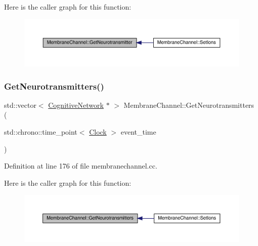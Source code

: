 Here is the caller graph for this function\+:\nopagebreak
\begin{figure}[H]
\begin{center}
\leavevmode
\includegraphics[width=350pt]{class_membrane_channel_a91ce6506a8e82905de7cd031ed5d63f5_icgraph}
\end{center}
\end{figure}
\mbox{\label{class_membrane_channel_a9fdb20eb7d3f9ebad864d07aaa835716}} 
\subsubsection{\texorpdfstring{Get\+Neurotransmitters()}{GetNeurotransmitters()}}
{\footnotesize\ttfamily std\+::vector$<$ \hyperlink{class_cognitive_network}{Cognitive\+Network} $\ast$ $>$ Membrane\+Channel\+::\+Get\+Neurotransmitters (\begin{DoxyParamCaption}\item[{std\+::chrono\+::time\+\_\+point$<$ \hyperlink{universe_8h_a0ef8d951d1ca5ab3cfaf7ab4c7a6fd80}{Clock} $>$}]{event\+\_\+time }\end{DoxyParamCaption})}



Definition at line 176 of file membranechannel.\+cc.

Here is the caller graph for this function\+:\nopagebreak
\begin{figure}[H]
\begin{center}
\leavevmode
\includegraphics[width=350pt]{class_membrane_channel_a9fdb20eb7d3f9ebad864d07aaa835716_icgraph}
\end{center}
\end{figure}
\mbox{\label{class_membrane_channel_a8eb115e2583e5bf0f37156f1fc974aa6}} 
